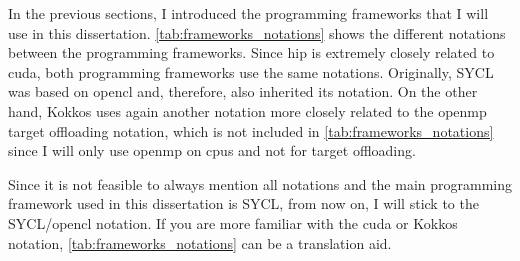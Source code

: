 In the previous sections, I introduced the programming frameworks that I will use in this dissertation. 
\autoref{tab:frameworks_notations} shows the different notations between the programming frameworks. 
Since \gls{hip} is extremely closely related to \gls{cuda}, both programming frameworks use the same notations. 
Originally, SYCL was based on \gls{opencl} and, therefore, also inherited its notation. 
On the other hand, Kokkos uses again another notation more closely related to the \gls{openmp} target offloading notation, which is not included in \autoref{tab:frameworks_notations} since I will only use \gls{openmp} on \glspl{cpu} and not for target offloading. 

Since it is not feasible to always mention all notations and the main programming framework used in this dissertation is SYCL, from now on, I will stick to the SYCL/\gls{opencl} notation. 
If you are more familiar with the \gls{cuda} or Kokkos notation, \autoref{tab:frameworks_notations} can be a translation aid. 